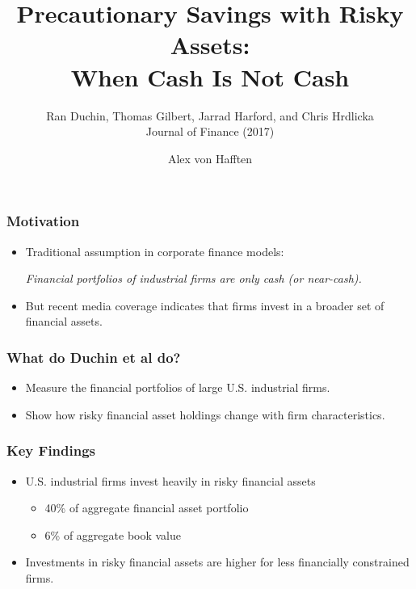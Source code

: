 \documentclass[handout]{beamer}
\title[Precautionary Savings with Risky Assets]{Precautionary Savings with Risky Assets: \\ When Cash Is Not Cash}
\subtitle{Ran Duchin, Thomas Gilbert, Jarrad Harford, and Chris Hrdlicka \\ Journal of Finance (2017)}
\author{Alex von Hafften}
\institute{UW-Madison}
\begin{document}
\begin{frame}
\titlepage
\end{frame}






\begin{frame}
\frametitle{Motivation}
\begin{itemize}[<+->]
\item Traditional assumption in corporate finance models:

\bigskip

\textit{Financial portfolios of industrial firms are only cash (or near-cash).}

\bigskip

\item But recent media coverage indicates that firms invest in a broader set of financial assets.
\end{itemize}
\end{frame}

\begin{frame}
\frametitle{What do Duchin et al do?}
\begin{itemize}[<+->]
\item Measure the financial portfolios of large U.S. industrial firms.
\bigskip
\item Show how risky financial asset holdings change with firm characteristics.
\end{itemize}
\end{frame}

\begin{frame}
\frametitle{Key Findings}
\begin{itemize}[<+->]
\item U.S. industrial firms invest heavily in risky financial assets
\begin{itemize}[<+->]
\item 40\% of aggregate financial asset portfolio
\item 6\% of aggregate book value
\end{itemize}
\bigskip
\item Investments in risky financial assets are higher for less financially constrained firms.
\end{itemize}
\end{frame}

\end{document}
